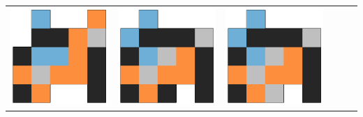 \begin{tabular}{cccccc}
    \rule{0pt}{9ex}  
    \includegraphics[scale=0.1]{images/top_designs/pusher/ga/exp1/gen29_ind0} &
    \includegraphics[scale=0.1]{images/top_designs/pusher/ga/exp1/gen29_ind1} &
    \includegraphics[scale=0.1]{images/top_designs/pusher/ga/exp1/gen29_ind2} &

\end{tabular}
